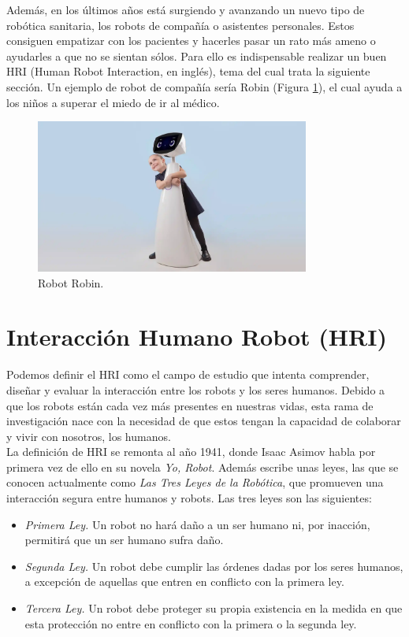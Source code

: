 \begin{itemize}
Además, en los últimos años está surgiendo y avanzando un nuevo tipo de robótica sanitaria, los robots de compañía o asistentes personales. Estos consiguen empatizar con los pacientes y hacerles pasar un rato más ameno o ayudarles a que no se sientan sólos. Para ello es indispensable realizar un buen HRI (Human Robot Interaction, en inglés), tema del cual trata la siguiente sección. Un ejemplo de robot de compañía sería Robin (Figura \ref{fig:robin}), el cual ayuda a los niños a superar el miedo de ir al médico.

\begin{figure} [h!]
  \begin{center}
    \includegraphics[width=9cm]{figs/robin.png}
  \end{center}
  \caption{Robot Robin.}
  \label{fig:robin}
\end{figure}
\end{itemize}

\section{Interacción Humano Robot (HRI)}
\label{sec:interaccion_humano_robot}

Podemos definir el HRI como el campo de estudio que intenta comprender, diseñar y evaluar la interacción entre los robots y los seres humanos. Debido a que los robots están cada vez más presentes en nuestras vidas, esta rama de investigación nace con la necesidad de que estos tengan la capacidad de colaborar y vivir con nosotros, los humanos.\\

La definición de HRI se remonta al año 1941, donde Isaac Asimov habla por primera vez de ello en su novela \textit{Yo, Robot}. Además escribe unas leyes, las que se conocen actualmente como \textit{Las Tres Leyes de la Robótica}, que promueven una interacción segura entre humanos y robots. Las tres leyes son las siguientes:

\begin{itemize}
    \item \textit{Primera Ley.} Un robot no hará daño a un ser humano ni, por inacción, permitirá que un ser humano sufra daño.
    \item \textit{Segunda Ley.} Un robot debe cumplir las órdenes dadas por los seres humanos, a excepción de aquellas que entren en conflicto con la primera ley.
    \item \textit{Tercera Ley.} Un robot debe proteger su propia existencia en la medida en que esta protección no entre en conflicto con la primera o la segunda ley.
\end{itemize}

